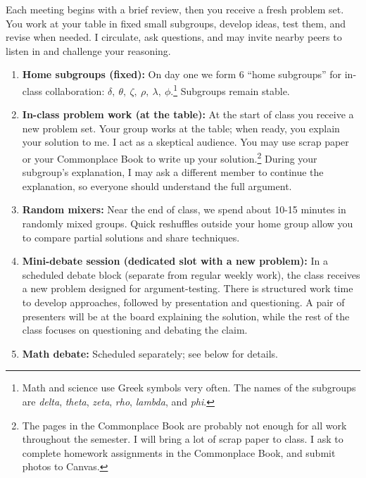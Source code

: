 \documentclass[oneside,11pt]{amsart}
\begin{document}
Each meeting begins with
a brief review, then you receive
a fresh problem set. You work at your table in fixed small subgroups, develop ideas, test them, and revise when needed. I circulate, ask questions, and may invite nearby peers to listen in and
challenge your reasoning.

\begin{enumerate}[$\bullet$]
  \item \textbf{Home subgroups (fixed):} On day one we form 6 ``home subgroups'' for in-class collaboration:
  $\delta, \ \theta, \ \zeta, \ \rho, \ \lambda, \ \phi$.\footnote{Math and science use Greek symbols very often. The names of the subgroups are
	\emph{delta}, \emph{theta}, \emph{zeta}, \emph{rho}, \emph{lambda}, and \emph{phi}.}
	Subgroups remain stable.

  \item \textbf{In-class problem work (at the table):} At
	the start of class you receive a new problem set.
	Your group works at the table; when ready, you explain
	your solution to me. I act as a skeptical audience.
	You may use scrap paper or your Commonplace Book to write up your solution.\footnote{The pages
	in the Commonplace Book are probably not enough for all work throughout the semester. I will bring
	a lot of scrap paper to class. I ask to complete homework assignments in the Commonplace Book, and
	submit photos to Canvas.}
	During your subgroup's explanation, I may ask a different member to continue the explanation,
	so everyone should understand the full argument.

  \item \textbf{Random mixers:}
		Near the end of class, we spend about 10-15 minutes
		in randomly mixed groups.
		Quick reshuffles outside your home group allow you
		to compare partial solutions and share techniques.

	 \item \textbf{Mini-debate session (dedicated slot with a new
	 problem):} In a scheduled debate block (separate from
	 regular weekly work), the class receives a {new}
	 problem designed for argument-testing. There is
	 structured {work time} to develop approaches,
	 followed by {presentation and questioning}.
	 A pair of presenters will be at the board explaining the
	 solution, while the rest of the class
	 focuses on questioning and debating the claim.

	\item \textbf{Math debate:} Scheduled separately; see below for details.


\end{enumerate}
\end{document}
